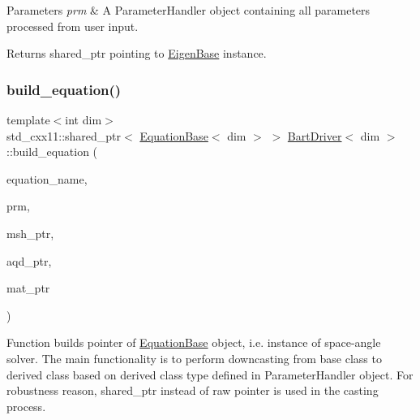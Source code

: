 \begin{DoxyParams}{Parameters}
{\em prm} & A Parameter\+Handler object containing all parameters processed from user input. \\
\hline
\end{DoxyParams}
\begin{DoxyReturn}{Returns}
shared\+\_\+ptr pointing to \hyperlink{class_eigen_base}{Eigen\+Base} instance. 
\end{DoxyReturn}
\mbox{\label{class_bart_driver_a10475395d7db9274b69349420460243d}} 
\subsubsection{\texorpdfstring{build\+\_\+equation()}{build\_equation()}}
{\footnotesize\ttfamily template$<$int dim$>$ \\
std\+\_\+cxx11\+::shared\+\_\+ptr$<$ \hyperlink{class_equation_base}{Equation\+Base}$<$ dim $>$ $>$ \hyperlink{class_bart_driver}{Bart\+Driver}$<$ dim $>$\+::build\+\_\+equation (\begin{DoxyParamCaption}\item[{std\+::string}]{equation\+\_\+name,  }\item[{const Parameter\+Handler \&}]{prm,  }\item[{const std\+\_\+cxx11\+::shared\+\_\+ptr$<$ \hyperlink{class_mesh_generator}{Mesh\+Generator}$<$ dim $>$ $>$}]{msh\+\_\+ptr,  }\item[{const std\+\_\+cxx11\+::shared\+\_\+ptr$<$ \hyperlink{class_a_q_base}{A\+Q\+Base}$<$ dim $>$ $>$}]{aqd\+\_\+ptr,  }\item[{const std\+\_\+cxx11\+::shared\+\_\+ptr$<$ \hyperlink{class_material_properties}{Material\+Properties} $>$}]{mat\+\_\+ptr }\end{DoxyParamCaption})\hspace{0.3cm}{\ttfamily [private]}}

Function builds pointer of \hyperlink{class_equation_base}{Equation\+Base} object, i.\+e. instance of space-\/angle solver. The main functionality is to perform downcasting from base class to derived class based on derived class type defined in Parameter\+Handler object. For robustness reason, shared\+\_\+ptr instead of raw pointer is used in the casting process.


